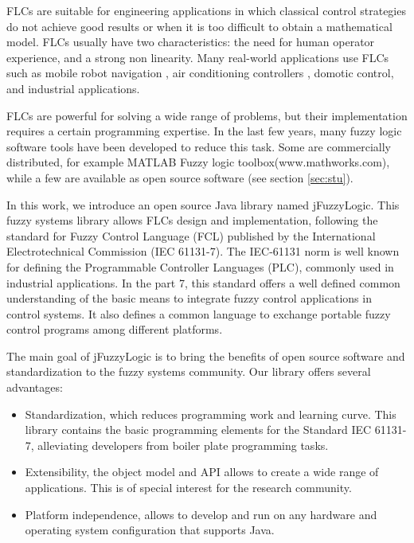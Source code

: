 \documentclass[conference]{IEEEtran}
\begin{document}
FLCs are suitable for engineering applications in which classical control strategies do not achieve good results or when it is too difficult to obtain a mathematical model.
FLCs usually have two characteristics: the need for human operator experience, and a strong non linearity.
Many real-world applications use FLCs~\cite{PDH97} such as mobile robot navigation \cite{MAA10,JCh2011}, air conditioning controllers \cite{Alc12,Cho11}, domotic control\cite{Cha12,AL05}, and industrial applications\cite{ZG2012,Demir12}.

FLCs are powerful for solving a wide range of problems, but their implementation requires a certain programming expertise.
In the last few years, many fuzzy logic software tools have been developed to reduce this task. 
Some are commercially distributed, for example MATLAB Fuzzy logic toolbox(www.mathworks.com), while a few are available as open source software (see section \ref{sec:stu}).

In this work, we introduce an open source Java library named jFuzzyLogic. 
This fuzzy systems library allows FLCs design and implementation, following the standard for Fuzzy Control Language (FCL) published by the International Electrotechnical Commission (IEC 61131-7)\cite{IEC}. 
The IEC-61131 norm is well known for defining the Programmable Controller Languages (PLC), commonly used in industrial applications.
In the part 7, this standard offers a well defined common understanding of the basic means to integrate fuzzy control applications in control systems.
It also defines a common language to exchange portable fuzzy control programs among different platforms.

The main goal of jFuzzyLogic is to bring the benefits of open source software and standardization to the fuzzy systems community. Our library offers several advantages:

\begin{itemize}

	\item Standardization, which reduces programming work and learning curve. This library contains the basic programming elements for the Standard IEC 61131-7, alleviating developers from boiler plate programming tasks.

	\item Extensibility, the object model and API allows to create a wide range of applications. This is of special interest for the research community.

	\item Platform independence, allows to develop and run on any hardware and operating system configuration that supports Java.

\end{itemize}
\end{document}
